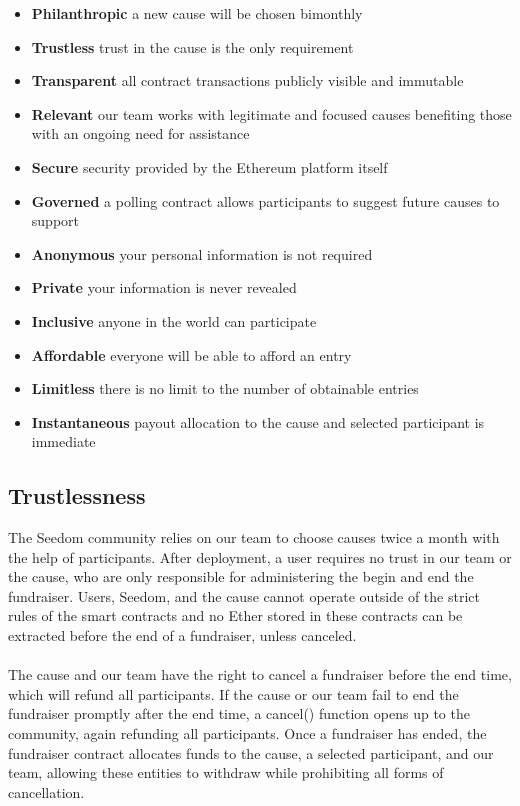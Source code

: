 \documentclass[11pt]{article}
\begin{document}
\begin{itemize}
\item{\textbf{Philanthropic} a new cause will be chosen bimonthly}
\item{\textbf{Trustless} trust in the cause is the only requirement}
\item{\textbf{Transparent} all contract transactions publicly visible and immutable}
\item{\textbf{Relevant} our team works with legitimate and focused causes benefiting those with an ongoing need for assistance}
\item{\textbf{Secure} security provided by the Ethereum platform itself}
\item{\textbf{Governed} a polling contract allows participants to suggest future causes to support}
\item{\textbf{Anonymous} your personal information is not required}
\item{\textbf{Private} your information is never revealed}
\item{\textbf{Inclusive} anyone in the world can participate}
\item{\textbf{Affordable} everyone will be able to afford an entry}
\item{\textbf{Limitless} there is no limit to the number of obtainable entries}
\item{\textbf{Instantaneous} payout allocation to the cause and selected participant is immediate}
\end{itemize}

\subsection{Trustlessness}

The Seedom community relies on our team to choose causes twice a month with the help of participants. After deployment, a user requires no trust in our team or the cause, who are only responsible for administering the begin and end the fundraiser. Users, Seedom, and the cause cannot operate outside of the strict rules of the smart contracts and no Ether stored in these contracts can be extracted before the end of a fundraiser, unless canceled.\\\\
The cause and our team have the right to cancel a fundraiser before the end time, which will refund all participants. If the cause or our team fail to end the fundraiser promptly after the end time, a cancel() function opens up to the community, again refunding all participants. Once a fundraiser has ended, the fundraiser contract allocates funds to the cause, a selected participant, and our team, allowing these entities to withdraw while prohibiting all forms of cancellation.
\end{document}
